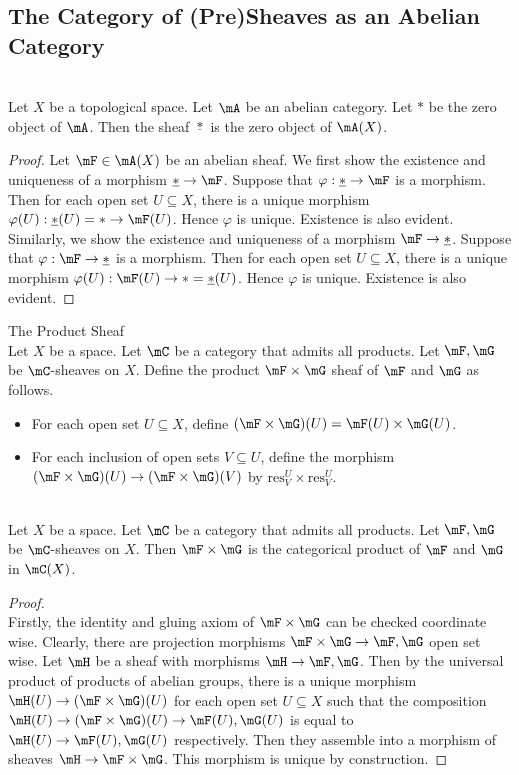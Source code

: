 \documentclass[a4paper]{article}
\begin{document}
\subsection{The Category of (Pre)Sheaves as an Abelian Category}
\begin{lmm}{}{}\\
Let $X$ be a topological space. Let $\mA$ be an abelian category. Let $\ast$ be the zero object of $\mA$. Then the sheaf $\underline{\ast}$ is the zero object of $\mA(X)$. 
\begin{proof}
Let $\mF\in\mA(X)$ be an abelian sheaf. We first show the existence and uniqueness of a morphism $\underline{\ast}\to\mF$. Suppose that $\varphi:\underline{\ast}\to\mF$ is a morphism. Then for each open set $U\subseteq X$, there is a unique morphism $\varphi(U):\underline{\ast}(U)=\ast\to\mF(U)$. Hence $\varphi$ is unique. Existence is also evident. \\

Similarly, we show the existence and uniqueness of a morphism $\mF\to\underline{\ast}$. Suppose that $\varphi:\mF\to\underline{\ast}$ is a morphism. Then for each open set $U\subseteq X$, there is a unique morphism $\varphi(U):\mF(U)\to\ast=\underline{\ast}(U)$. Hence $\varphi$ is unique. Existence is also evident. 
\end{proof}
\end{lmm}

\begin{defn}{The Product Sheaf}{}\\
Let $X$ be a space. Let $\mC$ be a category that admits all products. Let $\mF,\mG$ be $\mC$-sheaves on $X$. Define the product $\mF\times\mG$ sheaf of $\mF$ and $\mG$ as follows. 
\begin{itemize}
\item For each open set $U\subseteq X$, define $(\mF\times\mG)(U)=\mF(U)\times\mG(U)$. 
\item For each inclusion of open sets $V\subseteq U$, define the morphism $(\mF\times\mG)(U)\to(\mF\times\mG)(V)$ by $\text{res}_V^U\times\text{res}_V^U$. 
\end{itemize}
\end{defn}

\begin{lmm}{}{}\\
Let $X$ be a space. Let $\mC$ be a category that admits all products. Let $\mF,\mG$ be $\mC$-sheaves on $X$. Then $\mF\times\mG$ is the categorical product of $\mF$ and $\mG$ in $\mC(X)$. 
\begin{proof}\\
Firstly, the identity and gluing axiom of $\mF\times\mG$ can be checked coordinate wise. Clearly, there are projection morphisms $\mF\times\mG\to\mF,\mG$ open set wise. Let $\mH$ be a sheaf with morphisms $\mH\to\mF,\mG$. Then by the universal product of products of abelian groups, there is a unique morphism $\mH(U)\to(\mF\times\mG)(U)$ for each open set $U\subseteq X$ such that the composition $\mH(U)\to(\mF\times\mG)(U)\to\mF(U),\mG(U)$ is equal to $\mH(U)\to\mF(U),\mG(U)$ respectively. Then they assemble into a morphism of sheaves $\mH\to\mF\times\mG$. This morphism is unique by construction. 
\end{proof}
\end{lmm}
\end{document}
